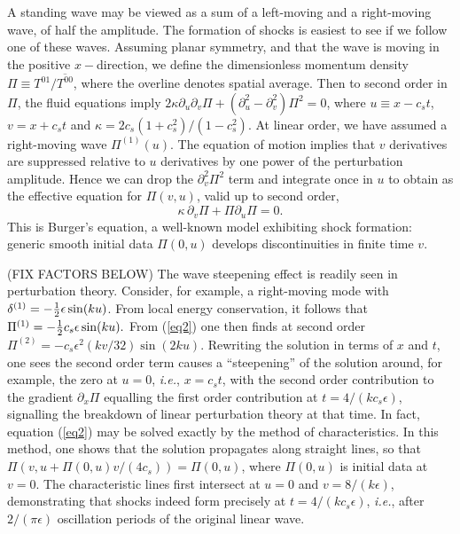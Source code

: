 \documentclass[prl,aps,10pt,twocolumn,showkeys,nofootinbib]{revtex4-1}
\def\be{\begin{equation}}
\def\ee{\end{equation}}
\begin{document}
A standing wave may be viewed as a sum of a left-moving and a right-moving wave, of half the amplitude. The formation of shocks is easiest to see if we follow one of these waves. Assuming planar symmetry, and that the wave is  moving in the positive $x-$direction, we define the dimensionless momentum density $\Pi\equiv T^{01}/\overline{T^{00}}$, where the overline denotes spatial average. Then to second order in $\Pi$, the fluid equations imply $2\kappa \partial_u \partial_v \Pi +(\partial_u^2-\partial_v^2)\Pi^2=0$, where $u\equiv x-c_s t$, $v=x+c_s t$ and $\kappa=2 c_s(1+c_s^2)/(1-c_s^2)$. At linear order, we have assumed a right-moving wave $\Pi^{(1)}(u)$. The equation of motion implies that $v$ derivatives are suppressed relative to $u$ derivatives by one power of the perturbation amplitude. Hence we can drop the $\partial_v^2\Pi^2$ term and integrate once in $u$ to obtain as the effective equation for $\Pi(v,u)$, valid up to second order,
\be
\kappa \, \partial_v \Pi + \Pi \partial_u \Pi=0.
\label{eq2}
\ee
This is Burger's equation, a well-known model exhibiting shock formation: generic smooth initial data $\Pi(0,u)$ develops discontinuities in finite time $v$. 

(FIX FACTORS BELOW)
The wave steepening effect is readily seen in perturbation theory. Consider, for example, a right-moving mode with $\delta^{(1)}=-{1\over 2} \epsilon \sin (k u)$. From local energy conservation, it follows that $\Pi^{(1)}=-{1\over 2}  c_s \epsilon \sin (k u).$  From (\ref{eq2}) one then finds at second order $\Pi^{(2)}=-c_s \epsilon^2 (k v/32) \sin (2 k u)$. Rewriting the solution in terms of $x$ and $t$, one sees the second order term causes a ``steepening'' of the solution around, for example, the zero at $u=0$, {\it i.e.}, $x=c_s t$, with the second order contribution to the gradient $\partial_x \Pi$ equalling the first order contribution at $t=4/(k c_s \epsilon)$, signalling the breakdown of linear perturbation theory at that time. In fact, equation (\ref{eq2}) may be solved exactly by the method of characteristics. In this method, one shows that the solution propagates along straight lines, so that $\Pi(v,u+\Pi(0,u) v/(4 c_s))=\Pi(0,u)$, where $\Pi(0,u)$ is initial data at $v=0$. The characteristic lines first intersect at $u=0$ and $v=8/(k\epsilon)$, demonstrating that shocks indeed form precisely at $t=4/(k c_s \epsilon)$, {\it i.e.}, after $2/(\pi \epsilon)$ oscillation periods of the original linear wave. 
\end{document}
